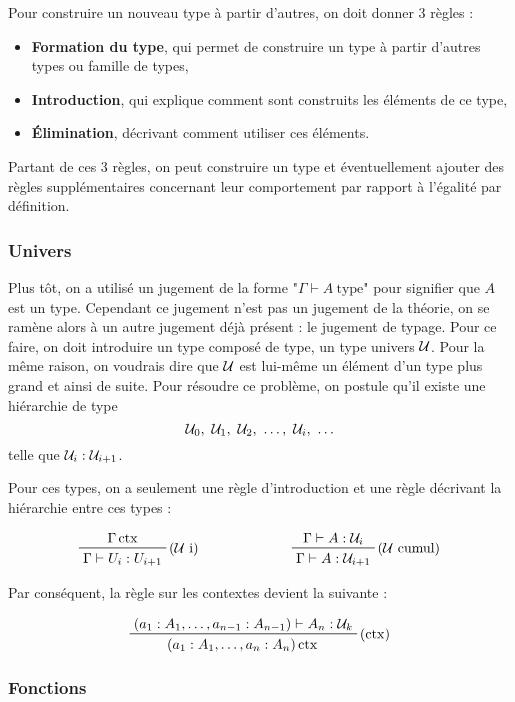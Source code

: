 \documentclass[../../rapport.tex]{subfiles}
\begin{document}
  Pour construire un nouveau type à partir d'autres, on doit donner 3 règles :
  \begin{itemize}
    \item \textbf{Formation du type}, qui permet de construire un type à partir d'autres types ou famille de types,
    \item \textbf{Introduction}, qui explique comment sont construits les éléments de ce type,
    \item \textbf{Élimination}, décrivant comment utiliser ces éléments.
  \end{itemize}

  Partant de ces 3 règles, on peut construire un type et éventuellement ajouter des règles supplémentaires concernant
  leur comportement par rapport à l'égalité par définition.

  \subsubsection{Univers}

  Plus tôt, on a utilisé un jugement de la forme "$\Gamma \vdash A\ \text{type}$" pour signifier que $A$ est un type.
  Cependant ce jugement n'est pas un jugement de la théorie, on se ramène alors à un autre jugement déjà présent :
  le jugement de typage.
  Pour ce faire, on doit introduire un type composé de type, un type univers $\mathcal U$.
  Pour la même raison, on voudrais dire que $\mathcal U$ est lui-même un élément d'un type plus grand et ainsi de suite.
  Pour résoudre ce problème, on postule qu'il existe une hiérarchie de type
  $$\U_0,\ \U_1,\ \U_2,\ \hdots,\ \U_i,\ \hdots$$
  telle que $\mathcal U_i : \mathcal U_{i+1}$.

  Pour ces types, on a seulement une règle d'introduction et une règle décrivant la hiérarchie entre ces types :

  $$
  \begin{array}{cc}
    \prftree[r]{($\U$ i)}{\Gamma \ctx}{\Gamma \vdash U_i : U_{i+1}} \hspace{2cm}
    & \prftree[r]{($\U$ cumul)}{\Gamma \vdash A : \U_i}{\Gamma \vdash A : \U_{i+1}}
  \end{array}
  $$

  Par conséquent, la règle sur les contextes devient la suivante :

  $$
  \prftree[r]{($\ctx$)}{(a_1 : A_1, \hdots, a_{n-1} : A_{n-1}) \vdash A_n : \U_k}
    {(a_1 : A_1, \hdots, a_n : A_n) \ctx}
  $$

  \subsubsection{Fonctions}
\end{document}
